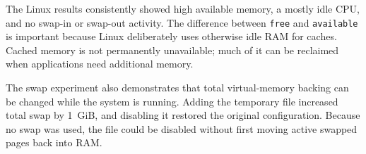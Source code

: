 
The Linux results consistently showed high available memory, a mostly idle CPU,
and no swap-in or swap-out activity. The difference between \texttt{free} and
\texttt{available} is important because Linux deliberately uses otherwise idle
RAM for caches. Cached memory is not permanently unavailable; much of it can be
reclaimed when applications need additional memory.

The swap experiment also demonstrates that total virtual-memory backing can be
changed while the system is running. Adding the temporary file increased total
swap by 1~GiB, and disabling it restored the original configuration. Because no
swap was used, the file could be disabled without first moving active swapped
pages back into RAM.
